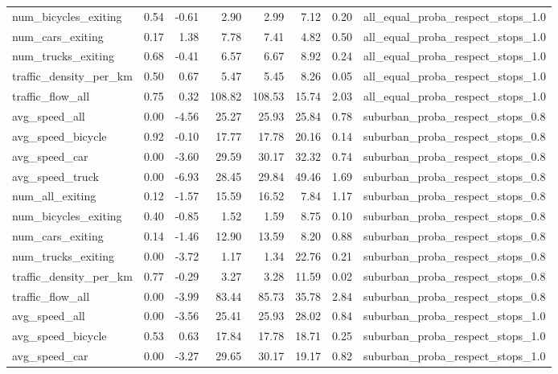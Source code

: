 \begin{table}[ht]
\begin{tabular}{lrrrrrrl}
  num\_bicycles\_exiting & 0.54 & -0.61 & 2.90 & 2.99 & 7.12 & 0.20 & all\_equal\_proba\_respect\_stops\_1.0 \\ 
  num\_cars\_exiting & 0.17 & 1.38 & 7.78 & 7.41 & 4.82 & 0.50 & all\_equal\_proba\_respect\_stops\_1.0 \\ 
  num\_trucks\_exiting & 0.68 & -0.41 & 6.57 & 6.67 & 8.92 & 0.24 & all\_equal\_proba\_respect\_stops\_1.0 \\ 
  traffic\_density\_per\_km & 0.50 & 0.67 & 5.47 & 5.45 & 8.26 & 0.05 & all\_equal\_proba\_respect\_stops\_1.0 \\ 
  traffic\_flow\_all & 0.75 & 0.32 & 108.82 & 108.53 & 15.74 & 2.03 & all\_equal\_proba\_respect\_stops\_1.0 \\ 
  avg\_speed\_all & 0.00 & -4.56 & 25.27 & 25.93 & 25.84 & 0.78 & suburban\_proba\_respect\_stops\_0.8 \\ 
  avg\_speed\_bicycle & 0.92 & -0.10 & 17.77 & 17.78 & 20.16 & 0.14 & suburban\_proba\_respect\_stops\_0.8 \\ 
  avg\_speed\_car & 0.00 & -3.60 & 29.59 & 30.17 & 32.32 & 0.74 & suburban\_proba\_respect\_stops\_0.8 \\ 
  avg\_speed\_truck & 0.00 & -6.93 & 28.45 & 29.84 & 49.46 & 1.69 & suburban\_proba\_respect\_stops\_0.8 \\ 
  num\_all\_exiting & 0.12 & -1.57 & 15.59 & 16.52 & 7.84 & 1.17 & suburban\_proba\_respect\_stops\_0.8 \\ 
  num\_bicycles\_exiting & 0.40 & -0.85 & 1.52 & 1.59 & 8.75 & 0.10 & suburban\_proba\_respect\_stops\_0.8 \\ 
  num\_cars\_exiting & 0.14 & -1.46 & 12.90 & 13.59 & 8.20 & 0.88 & suburban\_proba\_respect\_stops\_0.8 \\ 
  num\_trucks\_exiting & 0.00 & -3.72 & 1.17 & 1.34 & 22.76 & 0.21 & suburban\_proba\_respect\_stops\_0.8 \\ 
  traffic\_density\_per\_km & 0.77 & -0.29 & 3.27 & 3.28 & 11.59 & 0.02 & suburban\_proba\_respect\_stops\_0.8 \\ 
  traffic\_flow\_all & 0.00 & -3.99 & 83.44 & 85.73 & 35.78 & 2.84 & suburban\_proba\_respect\_stops\_0.8 \\ 
  avg\_speed\_all & 0.00 & -3.56 & 25.41 & 25.93 & 28.02 & 0.84 & suburban\_proba\_respect\_stops\_1.0 \\ 
  avg\_speed\_bicycle & 0.53 & 0.63 & 17.84 & 17.78 & 18.71 & 0.25 & suburban\_proba\_respect\_stops\_1.0 \\ 
  avg\_speed\_car & 0.00 & -3.27 & 29.65 & 30.17 & 19.17 & 0.82 & suburban\_proba\_respect\_stops\_1.0 \\ 

\end{tabular}
\end{table}
